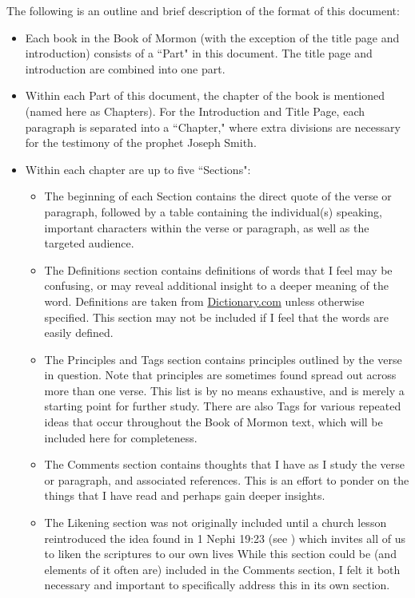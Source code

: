 \documentclass[12pt]{report}
\begin{document}
The following is an outline and brief description of the format of this document:
\begin{itemize}
\item Each book in the Book of Mormon (with the exception of the title page and introduction) consists of a ``Part" in this document.  The title page and introduction are combined into one part.
\item Within each Part of this document, the chapter of the book is mentioned (named here as Chapters).  For the Introduction and Title Page, each paragraph is separated into a ``Chapter," where extra divisions are necessary for the testimony of the prophet Joseph Smith.
\item Within each chapter are up to five ``Sections":
\begin{itemize}
\item The beginning of each Section contains the direct quote of the verse or paragraph, followed by a table containing the individual(s) speaking, important characters within the verse or paragraph, as well as the targeted audience.
\item The Definitions section contains definitions of words that I feel may be confusing, or may reveal additional insight to a deeper meaning of the word.  Definitions are taken from \href{http://www.dictionary.com}{Dictionary.com} unless otherwise specified.  This section may not be included if I feel that the words are easily defined.
\item The Principles and Tags section contains principles outlined by the verse in question.  Note that principles are sometimes found spread out across more than one verse.  This list is by no means exhaustive, and is merely a starting point for further study.  There are also Tags for various repeated ideas that occur throughout the Book of Mormon text, which will be included here for completeness.
\item The Comments section contains thoughts that I have as I study the verse or paragraph, and associated references.  This is an effort to ponder on the things that I have read and perhaps gain deeper insights.
\item The Likening section was not originally included until a church lesson reintroduced the idea found in 1 Nephi 19:23 (see ) which invites all of us to liken the scriptures to our own lives  While this section could be (and elements of it often are) included in the Comments section, I felt it both necessary and important to specifically address this in its own section.

\end{itemize}
\end{itemize}
\end{document}
